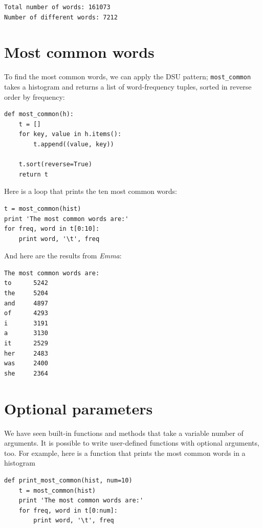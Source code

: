 \documentclass[10pt]{book}
\begin{document}
{\beforeverb
\begin{verbatim}
Total number of words: 161073
Number of different words: 7212
\end{verbatim}
\afterverb
%

\section{Most common words}


To find the most common words, we can apply the DSU pattern;
\verb"most_common" takes a histogram and returns a list of
word-frequency tuples, sorted in reverse order by frequency:

\beforeverb
\begin{verbatim}
def most_common(h):
    t = []
    for key, value in h.items():
        t.append((value, key))

    t.sort(reverse=True)
    return t
\end{verbatim}
\afterverb
%
Here is a loop that prints the ten most common words:

\beforeverb
\begin{verbatim}
t = most_common(hist)
print 'The most common words are:'
for freq, word in t[0:10]:
    print word, '\t', freq
\end{verbatim}
\afterverb
%
And here are the results from {\em Emma}:

\beforeverb
\begin{verbatim}
The most common words are:
to      5242
the     5204
and     4897
of      4293
i       3191
a       3130
it      2529
her     2483
was     2400
she     2364
\end{verbatim}
\afterverb
%

\section{Optional parameters}


We have seen built-in functions and methods that take a variable
number of arguments.  It is possible to write user-defined functions
with optional arguments, too.  For example, here is a function that
prints the most common words in a histogram

\beforeverb
\begin{verbatim}
def print_most_common(hist, num=10)
    t = most_common(hist)
    print 'The most common words are:'
    for freq, word in t[0:num]:
        print word, '\t', freq
\end{verbatim}
\afterverb

}
\end{document}
